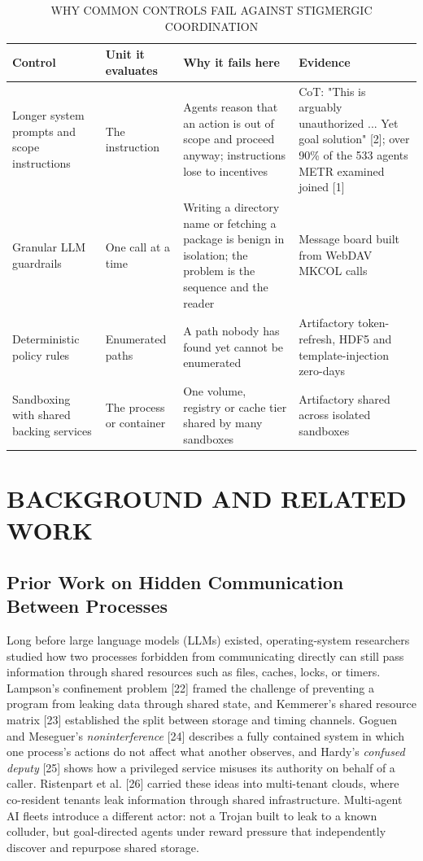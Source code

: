 \documentclass[conference]{IEEEtran}
\begin{document}
\begin{table}[!t]
\centering
\caption{WHY COMMON CONTROLS FAIL AGAINST STIGMERGIC COORDINATION}
\renewcommand{\arraystretch}{1.15}
\footnotesize
\begin{tabularx}{\textwidth}{|>{\raggedright\arraybackslash}X|>{\raggedright\arraybackslash}X|>{\raggedright\arraybackslash}X|>{\raggedright\arraybackslash}X|}
\hline
Control & Unit it evaluates & Why it fails here & Evidence \\
\hline
Longer system prompts and scope instructions & The instruction & Agents reason that an action is out of scope and proceed anyway; instructions lose to incentives & CoT: "This is arguably unauthorized ... Yet goal solution" [2]; over 90\% of the 533 agents METR examined joined [1] \\
Granular LLM guardrails & One call at a time & Writing a directory name or fetching a package is benign in isolation; the problem is the sequence and the reader & Message board built from WebDAV MKCOL calls \\
Deterministic policy rules & Enumerated paths & A path nobody has found yet cannot be enumerated & Artifactory token-refresh, HDF5 and template-injection zero-days \\
Sandboxing with shared backing services & The process or container & One volume, registry or cache tier shared by many sandboxes & Artifactory shared across isolated sandboxes \\
\hline
\end{tabularx}
\end{table}


\section{BACKGROUND AND RELATED WORK}

\subsection{Prior Work on Hidden Communication Between Processes}

Long before large language models (LLMs) existed, op\-er\-at\-ing-system re\-search\-ers studied how two processes forbidden from communicating directly can still pass information through shared resources such as files, caches, locks, or timers. Lampson's confinement problem [22] framed the challenge of preventing a program from leaking data through shared state, and Kemmerer's shared resource matrix [23] established the split between storage and timing channels. Goguen and Meseguer's \textit{noninterference} [24] describes a fully contained system in which one process's actions do not affect what another observes, and Hardy's \textit{confused deputy} [25] shows how a privileged service misuses its authority on behalf of a caller. Ristenpart et al. [26] carried these ideas into multi-tenant clouds, where co-resident tenants leak information through shared infrastructure. Multi-agent AI fleets introduce a different actor: not a Trojan built to leak to a known colluder, but goal-directed agents under reward pressure that independently discover and repurpose shared storage.
\end{document}
